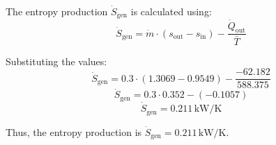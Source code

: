 The entropy production \( \dot{S}_{\text{gen}} \) is calculated using:  
\[
\dot{S}_{\text{gen}} = \dot{m} \cdot (s_{\text{out}} - s_{\text{in}}) - \frac{\dot{Q}_{\text{out}}}{\bar{T}}
\]  

Substituting the values:  
\[
\dot{S}_{\text{gen}} = 0.3 \cdot (1.3069 - 0.9549) - \frac{-62.182}{588.375}
\]  
\[
\dot{S}_{\text{gen}} = 0.3 \cdot 0.352 - (-0.1057)
\]  
\[
\dot{S}_{\text{gen}} = 0.211 \, \text{kW/K}
\]  

Thus, the entropy production is \( \dot{S}_{\text{gen}} = 0.211 \, \text{kW/K} \).